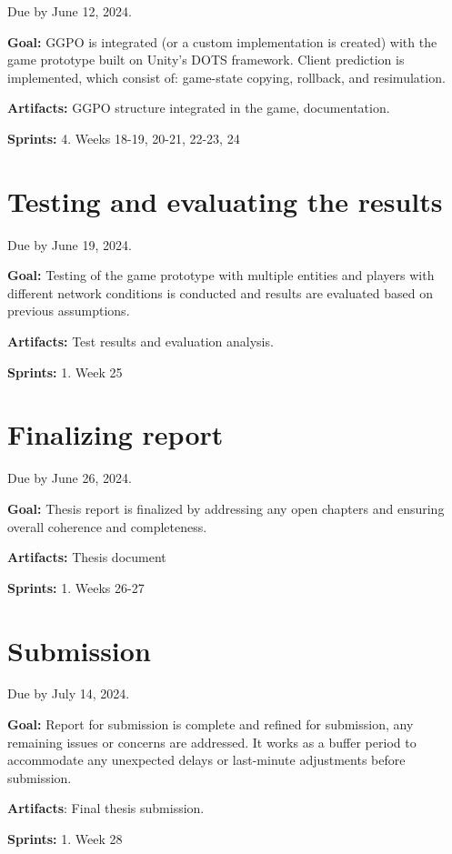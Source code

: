 Due by June 12, 2024.\newline

\noindent\textbf{Goal:} GGPO is integrated (or a custom implementation is created) with the game prototype built on Unity's DOTS framework. Client prediction is implemented, which consist of: game-state copying, rollback, and resimulation.\newline

\noindent\textbf{Artifacts:} GGPO structure integrated in the game, documentation. \newline

\noindent\textbf{Sprints:} 4. Weeks 18-19, 20-21, 22-23, 24\newline

\section{Testing and evaluating the results}

Due by June 19, 2024.\newline

\noindent\textbf{Goal:} Testing of the game prototype with multiple entities and players with different network conditions is conducted and results are evaluated based on previous assumptions. \newline

\noindent\textbf{Artifacts:} Test results and evaluation analysis. \newline

\noindent\textbf{Sprints:} 1. Week 25\newline

\section{Finalizing report}

Due by June 26, 2024.\newline

\noindent\textbf{Goal:} Thesis report is finalized by addressing any open chapters and ensuring overall coherence and completeness.\newline

\noindent\textbf{Artifacts:} Thesis document \newline

\noindent\textbf{Sprints:} 1. Weeks 26-27\newline

\section{Submission}

Due by July 14, 2024.\newline

\noindent\textbf{Goal:} Report for submission is complete and refined for submission, any remaining issues or concerns are addressed. It works as a buffer period to accommodate any unexpected delays or last-minute adjustments before submission.\newline

\noindent\textbf{Artifacts}: Final thesis submission.

\noindent\textbf{Sprints:} 1. Week 28